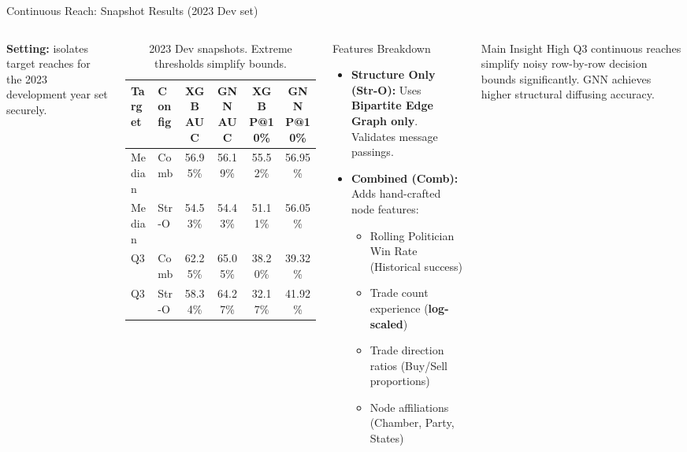 \documentclass[aspectratio=169,11pt]{beamer}
\begin{document}
\begin{frame}{Continuous Reach: Snapshot Results (2023 Dev set)}
  \begin{columns}[T]
      \small
      \textbf{Setting:} isolates target reaches for the 2023 development year set securely.
      
      \renewcommand{\arraystretch}{1.0}
      \setlength{\tabcolsep}{3pt}
      \begin{table}
        \tiny
        \begin{tabular}{llcccc}
          \toprule
          \textbf{Target} & \textbf{Config} & \textbf{XGB AUC} & \textbf{GNN AUC} & \textbf{XGB P@10\%} & \textbf{GNN P@10\%} \\
          \midrule
          Median & Comb       & 56.95\% & 56.19\% & 55.52\% & 56.95\% \\
          Median & Str-O     & 54.53\% & 54.43\% & 51.11\% & 56.05\% \\
          \midrule
          Q3    & Comb       & 62.25\% & 65.05\% & 38.20\% & 39.32\% \\
          
          Q3    & Str-O & 58.34\% & 64.27\% & 32.17\% & 41.92\% \\
          \bottomrule
        \end{tabular}
        \caption{\tiny 2023 Dev snapshots. Extreme thresholds simplify bounds.}
      \end{table}

      \begin{block}{Features Breakdown}
        \tiny
        \begin{itemize}
          \item \textbf{Structure Only (Str-O):} Uses \textbf{Bipartite Edge Graph only}. Validates message passings.
          \item \textbf{Combined (Comb):} Adds hand-crafted node features:
            \begin{itemize}
              \tiny
              \item Rolling Politician Win Rate (Historical success)
              \item Trade count experience (\textbf{log-scaled})
              \item Trade direction ratios (Buy/Sell proportions)
              \item Node affiliations (Chamber, Party, States)
            \end{itemize}
        \end{itemize}
      \end{block}

      \begin{alertblock}{Main Insight}
        \tiny High Q3 continuous reaches simplify noisy row-by-row decision bounds significantly. GNN achieves higher structural diffusing accuracy.
      \end{alertblock}
  \end{columns}
\end{frame}
\end{document}
